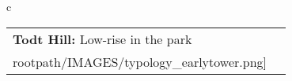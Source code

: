 \begin{table}[H]
        \begin{tabular}{c}
        \begin{tabular}{m{1.5in} m{2in}}
\textbf{Todt Hill:} {Low-rise in the park} & \texttt{[image: \\rootpath/IMAGES/typology\_earlytower.png]}
\end{tabular}\end{tabular}
        \end{table}